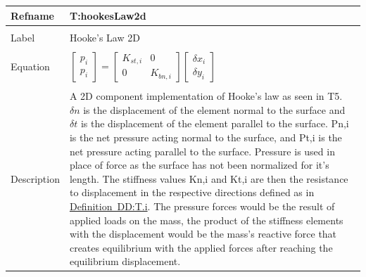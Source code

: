 \documentclass[12pt]{article}
\begin{document}
\noindent \begin{minipage}{\textwidth}
\begin{tabular}{p{} p{}}
\toprule \textbf{Refname} & \textbf{T:hookesLaw2d}
\label{T:hookesLaw2d}
\\ \midrule \\
Label & Hooke's Law 2D
\\ \midrule \\
Equation & $\begin{bmatrix}
p_{i}\\
p_{i}
\end{bmatrix}=\begin{bmatrix}
{K_{st,i}} & 0\\
0 & {K_{bn,i}}
\end{bmatrix} \begin{bmatrix}
{δx}_{i}\\
{δy}_{i}
\end{bmatrix}$
\\ \midrule \\
Description & A 2D component implementation of Hooke's law as seen in T5. $δn$ is the displacement of the element normal to the surface and $δt$ is the displacement of the element parallel to the surface. Pn,i is the net pressure acting normal to the surface, and Pt,i is the net pressure acting parallel to the surface. Pressure is used in place of force as the surface has not been normalized for it's length. The stiffness values Kn,i and Kt,i are then the resistance to displacement in the respective directions defined as in \hyperref[DD:T.i]{Definition~DD:T.i}. The pressure forces would be the result of applied loads on the mass, the product of the stiffness elements with the displacement would be the mass's reactive force that creates equilibrium with the applied forces after reaching the equilibrium displacement.
\\ \bottomrule \end{tabular}
\end{minipage}\\
~\newline
\end{document}
